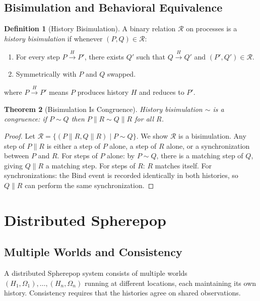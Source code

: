 \documentclass[12pt, a4paper, openany]{book}
\theoremstyle{plain}
\newtheorem{theorem}{Theorem}[chapter]
\theoremstyle{definition}
\newtheorem{definition}[theorem]{Definition}
\theoremstyle{remark}
\begin{document}
\section{Bisimulation and Behavioral Equivalence}

\begin{definition}[History Bisimulation]
A binary relation $\mathcal{R}$ on processes is a \emph{history bisimulation}
if whenever $(P, Q) \in \mathcal{R}$:
\begin{enumerate}
\item For every step $P \xrightarrow{H} P'$, there exists $Q'$ such that
$Q \xrightarrow{H} Q'$ and $(P', Q') \in \mathcal{R}$.
\item Symmetrically with $P$ and $Q$ swapped.
\end{enumerate}
where $P \xrightarrow{H} P'$ means $P$ produces history $H$ and reduces to $P'$.
\end{definition}

\begin{theorem}[Bisimulation Is Congruence]
History bisimulation $\sim$ is a congruence: if $P \sim Q$ then
$P \parallel R \sim Q \parallel R$ for all $R$.
\end{theorem}

\begin{proof}
Let $\mathcal{R} = \{(P \parallel R, Q \parallel R) \mid P \sim Q\}$. We show
$\mathcal{R}$ is a bisimulation. Any step of $P \parallel R$ is either a step
of $P$ alone, a step of $R$ alone, or a synchronization between $P$ and $R$.
For steps of $P$ alone: by $P \sim Q$, there is a matching step of $Q$,
giving $Q \parallel R$ a matching step. For steps of $R$: $R$ matches itself.
For synchronizations: the Bind event is recorded identically in both histories,
so $Q \parallel R$ can perform the same synchronization.
\end{proof}

\chapter{Distributed Spherepop}

\section{Multiple Worlds and Consistency}

A distributed Spherepop system consists of multiple worlds $(H_1, \Omega_1),
\ldots, (H_n, \Omega_n)$ running at different locations, each maintaining its
own history. Consistency requires that the histories agree on shared observations.
\end{document}

